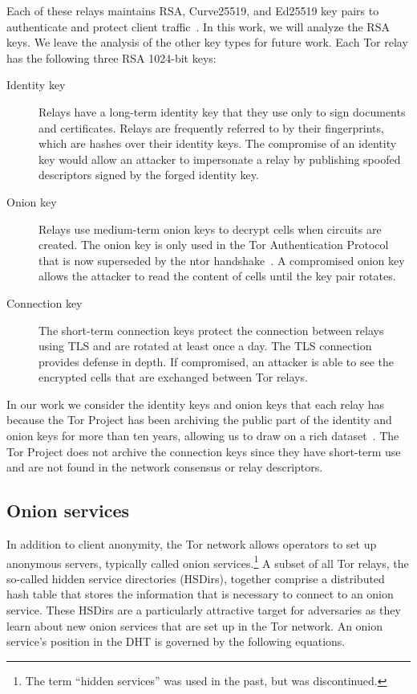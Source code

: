 Each of these relays maintains RSA, Curve25519, and Ed25519 key pairs to
authenticate and protect client traffic~\cite[\S~1.1]{torspec}. In this work, we
will analyze the RSA keys.  We leave the analysis of the other key types for
future work.  Each Tor relay has the following three RSA 1024-bit keys:

\begin{description}
	\item[Identity key] Relays have a long-term identity key that they use only
		to sign documents and certificates.  Relays are frequently referred to
		by their fingerprints, which are hashes over their identity keys.  The
		compromise of an identity key would allow an attacker to impersonate a
		relay by publishing spoofed descriptors signed by the forged identity
		key.

	\item[Onion key]  Relays use medium-term onion keys to decrypt cells when
		circuits are created.  The onion key is only used in the Tor
		Authentication Protocol that is now superseded by the ntor
		handshake~\cite{Goldberg2013a}.  A compromised onion key allows the
		attacker to read the content of cells until the key pair rotates.

	\item[Connection key] The short-term connection keys protect the connection
		between relays using TLS and are rotated at least once a day.  The TLS
		connection provides defense in depth.  If compromised, an attacker is
		able to see the encrypted cells that are exchanged between Tor relays.
\end{description}

In our work we consider the identity keys and onion keys that each relay has
because the Tor Project has been archiving the public part of the identity and
onion keys for more than ten years, allowing us to draw on a rich
dataset~\cite{collector}. The Tor Project does not archive the connection keys
since they have short-term use and are not found in the network consensus or
relay descriptors.

\subsection{Onion services}
In addition to client anonymity, the Tor network allows operators to set up
anonymous servers, typically called onion services.\footnote{The term ``hidden
services'' was used in the past, but was discontinued.} A subset of all Tor
relays, the so-called hidden service directories (HSDirs), together comprise a
distributed hash table that stores the information that is necessary to connect
to an onion service.  These HSDirs are a particularly attractive target for
adversaries as they learn about new onion services that are set up in the Tor
network.  An onion service's position in the DHT is governed by the following
equations.

